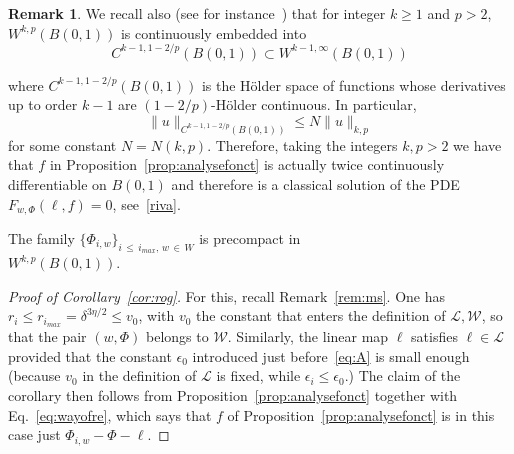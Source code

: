 \documentclass[10pt]{amsart}
\theoremstyle{definition}\newtheorem{defi}[theo]{Definition}\newtheorem{rema}[theo]{Remark}\newtheorem{exam}[theo]{Example}\newtheorem{exem}[theo]{Example}\newtheorem{nota}[theo]{Notation}
\newcommand{\clL}{\mathcal{L}}
\newcommand{\clW}{\mathcal{W}}
\begin{document}
\begin{rema}\label{rem:embed}
We recall also (see for instance~\cite[Th.~10.4.10]{krilov}) that for integer $k\ge1 $ and $p>2$, $W^{k,p}(B(0,1))$ is continuously embedded into
\begin{equation}
C^{k-1,1-2/p}(B(0,1))\subset W^{k-1,\infty}(B(0,1))
\end{equation}

where $C^{k-1,1-2/p}(B(0,1))$ is the H\"older space of functions whose derivatives up to order $k-1$ are $(1-2/p)$-H\"older continuous. In particular,
\begin{equation}\label{eq:sobolev}
\|u\|_{C^{k-1,1-2/p}(B(0,1))}\le N \|u\|_{k,p}
\end{equation}
for some constant $N=N(k,p)$. Therefore, taking the integers $k,p>2$ we have that $f$ in Proposition~\ref{prop:analysefonct} is actually twice continuously differentiable on $B(0,1)$ and therefore is a classical solution of the PDE $F_{w,\Phi}(\ell,f)=0$, see~\eqref{riva}.
\end{rema}


\begin{coro}\label{cor:rog}
The family $\{\Phi_{i,w}\}_{i\,\le\,i_{max},\,w\,\in\,W}$ is precompact in\\ $W^{k,p}(B(0,1))$.
\end{coro}

\begin{proof}[Proof of Corollary~\ref{cor:rog}]
For this, recall Remark~\ref{rem:ms}. One has $r_i\le r_{i_{max}}=\delta^{3\eta/2}\le v_0$, with $v_0$ the constant that enters the definition of $\clL,\clW$, so that the pair $(w,\Phi)$ belongs to $\clW$. Similarly, the linear map $\ell$ satisfies $\ell\in \clL$ provided that the constant $\epsilon_0$ introduced just before~\eqref{eq:A} is small enough (because $v_0$ in the definition of $\clL$ is fixed, while $\epsilon_i\le
\epsilon_0$.) The claim of the corollary then follows from Proposition~\ref{prop:analysefonct} together with Eq.~\eqref{eq:wayofre}, which says that $f$ of Proposition~\ref{prop:analysefonct} is in this case just $\Phi_{i,w}-\Phi-\ell$.
\end{proof}
\end{document}

